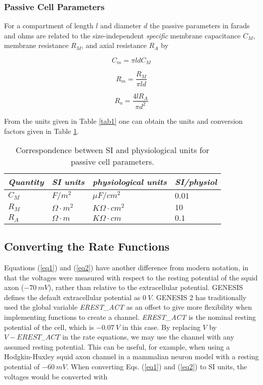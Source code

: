 \documentclass[12pt]{article}
\begin{document}
\subsubsection{Passive Cell Parameters}

For a compartment of length $l$ and diameter $d$ the passive parameters
in farads and ohms are related to the size-independent {\em specific} membrane
capacitance $C_M$, membrane resistance $R_M$, and axial resistance $R_A$ by

\begin{equation}
C_{m} =  \pi l d C_M
\end{equation}

\begin{equation}
R_{m} = \frac{R_M}{\pi l d}
\end{equation}

\begin{equation}
R_{a}= \frac{4 l R_A}{\pi d^{2}}
\end{equation}
 
From the units given in Table \ref{tab1} one can obtain the units and
conversion factors given in Table \ref{tab2}.

\begin{table}[thb]
\label{tab2}
\centering
\begin{tabular}{llll} \hline
{\em Quantity} & {\em SI units} & {\em physiological units} & {\em SI/physiol} \\
\hline
  $C_M$  & $F/m^2$ &$\mu F/cm^2$  & $0.01$  \\
  $R_M$  & $\Omega \cdot m^2$ & $K \Omega \cdot cm^2$ & $10$ \\
  $R_A$  & $\Omega \cdot m$   & $K \Omega \cdot cm$ & $0.1$   \\
\hline
\end{tabular}
\caption{Correspondence between SI and physiological units for passive
cell parameters.}
\end{table}

\subsection{Converting the Rate Functions}

Equations (\ref{eq1}) and (\ref{eq2}) have another difference from modern
notation, in that the voltages were measured with respect to the resting
potential of the squid axon ($-70~mV$), rather than relative to the
extracellular potential.  GENESIS defines the default extracellular
potential as $0~V$.  GENESIS 2 has traditionally used the global variable
{\em EREST\_ACT} as an offset to give more flexibility when implementing
functions to create a channel.  {\em EREST\_ACT} is the nominal resting
potential of the cell, which is $-0.07~V$ in this case.  By replacing $V$
by $V - EREST_{-}ACT$ in the rate equations, we may use the channel with
any assumed resting potential.  This can be useful, for example, when using
a Hodgkin-Huxley squid axon channel in a mammalian neuron model with a
resting potential of $-60~mV$.  When converting Eqs. (\ref{eq1}) and
(\ref{eq2}) to SI units, the voltages would be converted with
\end{document}
